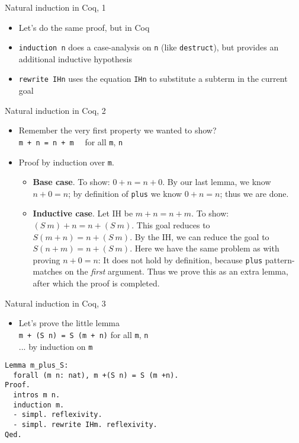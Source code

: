 \begin{frame}[fragile]{Natural induction in Coq, 1}
\begin{itemize}
  \item Let's do the same proof, but in Coq
  \pause
\end{itemize}

\begin{itemize}
  \item \lstinline|induction n| does a case-analysis on \lstinline|n| (like \lstinline|destruct|), but provides an additional inductive hypothesis
  \pause
  \item \lstinline|rewrite IHn| uses the equation \lstinline|IHn| to substitute a subterm in the current goal
\end{itemize}
\end{frame}

\begin{frame}[fragile]{Natural induction in Coq, 2}
\begin{itemize}
  \item Remember the very first property we wanted to show?\\
  \lstinline|m + n =|~\lstinline|n + m| ~~for all \lstinline|m|, \lstinline|n|
  \pause

  \item Proof by induction over \lstinline|m|.
  \begin{itemize}
    \item \textbf{Base case}. To show: $0 + n = n + 0$. By our last lemma, we know $n + 0 = n$; by definition of \lstinline|plus| we know $0 + n = n$; thus we are done.
    \item \textbf{Inductive case}. Let IH be $m + n = n + m$. To show: $(S~m) + n = n + (S~m)$. This goal reduces to $S (m + n) = n + (S~m)$. By the IH, we can reduce the goal to $S (n + m) = n + (S~m)$. Here we have the same problem as with proving $n + 0 = n$: It does not hold by definition, because \lstinline|plus| pattern-matches on the \textit{first} argument. Thus we prove this as an extra lemma, after which the proof is completed.
  \end{itemize}
\end{itemize}
\end{frame}

\begin{frame}[fragile]{Natural induction in Coq, 3}
\begin{itemize}
  \item Let's prove the little lemma\\
  \lstinline|m + (S n) =|~\lstinline|S (m + n)| for all \lstinline|m|, \lstinline|n|\\
  ... by induction on \lstinline|m|
  \pause
\end{itemize}
\begin{lstlisting}
Lemma m_plus_S:
  forall (m n: nat), m +(S n) = S (m +n).
Proof.
  intros m n.
  induction m.
  - simpl. reflexivity.
  - simpl. rewrite IHm. reflexivity.
Qed.
\end{lstlisting}
\end{frame}

